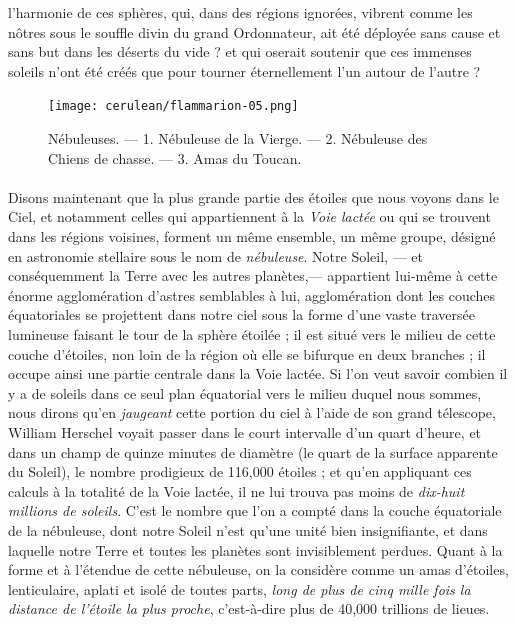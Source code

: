 \documentclass[a4paper, 11pt, oneside, landscape]{article}
\begin{document}
l'harmonie de ces sphères, qui, dans des régions ignorées, vibrent comme les nôtres sous le souffle divin du grand Ordonnateur, ait été déployée sans cause et sans but dans les déserts du vide ? et qui oserait soutenir que ces immenses soleils n'ont été créés que pour tourner éternellement l'un autour de l'autre ?
\clearpage
\begin{landscape}
\vspace*{\fill}
\begin{figure}[H]
\centering
\texttt{[image: cerulean/flammarion-05.png]}
\caption{Nébuleuses. --- 1. Nébuleuse de la Vierge. --- 2. Nébuleuse des Chiens de chasse. --- 3. Amas du Toucan.}
\end{figure}
\vspace*{\fill}
\end{landscape}
\clearpage
\paragraph{}
Disons maintenant que la plus grande partie des étoiles que nous voyons dans le Ciel, et notamment celles qui appartiennent à la \emph{Voie lactée} ou qui se trouvent dans les régions voisines, forment un même ensemble, un même groupe, désigné en astronomie stellaire sous le nom de \emph{nébuleuse}. Notre Soleil, --- et conséquemment la Terre avec les autres planètes,--- appartient lui-même à cette énorme agglomération d'astres semblables à lui, agglomération dont les couches équatoriales se projettent dans notre ciel sous la forme d'une vaste traversée lumineuse faisant le tour de la sphère étoilée ; il est situé vers le milieu de cette couche d'étoiles, non loin de la région où elle se bifurque en deux branches ; il occupe ainsi une partie centrale dans la Voie lactée. Si l'on veut savoir combien il y a de soleils dans ce seul plan équatorial vers le milieu duquel nous sommes, nous dirons qu'en \emph{jaugeant} cette portion du ciel à l'aide de son grand télescope, William Herschel voyait passer dans le court intervalle d'un quart d'heure, et dans un champ de quinze minutes de diamètre (le quart de la surface apparente du Soleil), le nombre prodigieux de 116,000 étoiles ; et qu'en appliquant ces calculs à la totalité de la Voie lactée, il ne lui trouva pas moins de \emph{dix-huit millions de soleils}. C'est le nombre que l'on a compté dans la couche équatoriale de la nébuleuse, dont notre Soleil n'est qu'une unité bien insignifiante, et dans laquelle notre Terre et toutes les planètes sont invisiblement perdues. Quant à la forme et à l'étendue de cette nébuleuse, on la considère comme un amas d'étoiles, lenticulaire, aplati et isolé de toutes parts, \emph{long de plus de cinq mille fois la distance de l'étoile la plus proche}, c'est-à-dire plus de 40,000 trillions de lieues.
\end{document}
